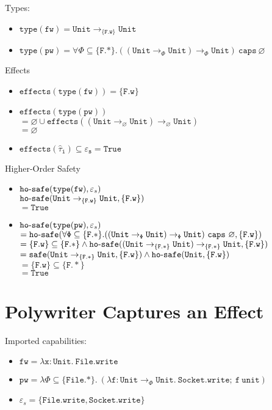 \documentclass{llncs}
\newcommand{\keywadj}[1]{\mathtt{#1}}
\newcommand{\keyw}[1]{\keywadj{#1}~}
\newcommand{\kw}[1]{\keyw{ #1 }}
\newcommand{\kwa}[1]{\keywadj{ #1 }}
\newcommand{\hyphen}{\hbox{-}}
\newcommand{\Unit}[0]{ \kwa{Unit} }
\newcommand{\safe}[2]{ \kwa{safe}(#1, #2) }
\newcommand{\hosafe}[2]{ \kwa{ho \hyphen safe}(#1, #2) }
\begin{document}
\noindent
Types:
\begin{itemize}
	\item $\kwa{type(fw) = \Unit \rightarrow_{\{F.w\}} \Unit}$
	\item $\kwa{type(pw) = \forall \Phi \subseteq \{F.*\}. ((Unit \rightarrow_{\Phi} Unit) \rightarrow_{\Phi} Unit) ~\kw{caps} \varnothing}$
\end{itemize}

\noindent
Effects
\begin{itemize}
	\item $\kwa{effects(type(fw)) = \{F.w\}}$
	\item $\kwa{effects(type(pw))}$ \\
	$\kwa{= \varnothing \cup effects((Unit \rightarrow_{\varnothing} Unit) \rightarrow_{\varnothing} Unit)}$\\
	$\kwa{= \varnothing}$
	\item $\kwa{effects(\hat \tau_i) \subseteq \varepsilon_s = True}$
\end{itemize}

\noindent
Higher-Order Safety
\begin{itemize}
	\item $\hosafe{\kwa{type(fw)}}{\varepsilon_s}$\\
		$\hosafe{\kwa{Unit \rightarrow_{\kwa\{{F.w\}}} Unit}}{\kwa{\{F.w\}}}$\\
		$= \kwa{True}$
	\item $\hosafe{\kwa{type(pw)}}{\varepsilon_s}$\\
		$= \hosafe{\kwa{ \forall \Phi \subseteq \{F.*\}. ((Unit \rightarrow_{\Phi} Unit) \rightarrow_{\Phi} Unit) ~\kw{caps} \varnothing }}{\{\kwa{F.w}\}}$\\
		$= \{ \kwa{F.w} \} \subseteq \{ \kwa{F.*}\} \land \hosafe{ \kwa{ (Unit \rightarrow_{\{\kwa{F.*}\}} Unit) \rightarrow_{\{\kwa{F.*}\}} Unit} }{\{\kwa{F.w}\}} $\\
		$= \safe{\kwa{Unit \rightarrow_{\{\kwa{F.*}\}} Unit}}{\{\kwa{F.w}\}} \land \hosafe{\Unit}{\{\kwa{F.w}\}}$\\
		$= \{ \kwa{F.w} \} \subseteq \{ \kwa{F.*} \}$\\
		$= \kwa{True}$
\end{itemize}

\section{Polywriter Captures an Effect}

Imported capabilities:
\begin{itemize}
	\item $\kwa{fw = \lambda x: Unit.~File.write}$
	\item $\kwa{pw = \lambda \Phi \subseteq \{ File.* \}.~ (\lambda f: Unit \rightarrow_{\Phi} \Unit. ~Socket.write;~f ~unit)}$
	\item $\varepsilon_s = \{\kwa{File.write, Socket.write}\}$
\end{itemize}
\end{document}
